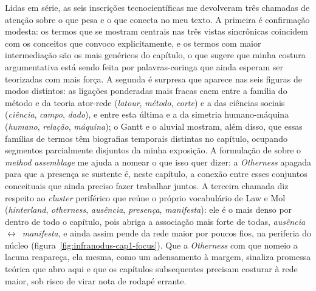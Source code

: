 Lidas em série, as seis inscrições tecnocientíficas me devolveram três chamadas de atenção sobre o que pesa e o que conecta no meu texto. A primeira é confirmação modesta: os termos que se mostram centrais nas três vistas sincrônicas coincidem com os conceitos que convoco explicitamente, e os termos com maior intermediação são os mais genéricos do capítulo, o que sugere que minha costura argumentativa está sendo feita por palavras-coringa que ainda esperam ser teorizadas com mais força. A segunda é surpresa que aparece nas seis figuras de modos distintos: as ligações ponderadas mais fracas caem entre a família do método e da teoria ator-rede (\textit{latour}, \textit{método}, \textit{corte}) e a das ciências sociais (\textit{ciência}, \textit{campo}, \textit{dado}), e entre esta última e a da simetria humano-máquina (\textit{humano}, \textit{relação}, \textit{máquina}); o Gantt e o aluvial mostram, além disso, que essas famílias de termos têm biografias temporais distintas no capítulo, ocupando segmentos parcialmente disjuntos da minha exposição.
A formulação de \textcite{Law2004After} sobre o \textit{method assemblage} me ajuda a nomear o que isso quer dizer: a \textit{Otherness} apagada para que a presença se sustente é, neste capítulo, a conexão entre esses conjuntos conceituais que ainda preciso fazer trabalhar juntos. A terceira chamada diz respeito ao \textit{cluster} periférico que reúne o próprio vocabulário de Law e Mol (\textit{hinterland}, \textit{otherness}, \textit{ausência}, \textit{presença}, \textit{manifesta}): ele é o mais denso por dentro de todo o capítulo, pois abriga a associação mais forte de todas, \textit{ausência}~$\leftrightarrow$~\textit{manifesta}, e ainda assim pende da rede maior por poucos fios, na periferia do núcleo (figura~\ref{fig:infranodus-cap1-focus}). Que a \textit{Otherness} com que nomeio a lacuna reapareça, ela mesma, como um adensamento à margem, sinaliza promessa teórica que abro aqui e que os capítulos subsequentes precisam costurar à rede maior, sob risco de virar nota de rodapé errante.

